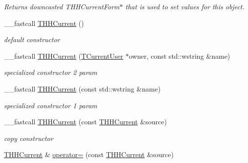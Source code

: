 \begin{DoxyCompactItemize}
\begin{DoxyCompactList}\small\item\em Returns downcasted T\+H\+H\+Current\+Form$\ast$ that is used to set values for this object. \end{DoxyCompactList}\item 
\hypertarget{class_t_h_h_current_a1cd5d04dc2985d3bd776dbb9e8ed2932}{\+\_\+\+\_\+fastcall \hyperlink{class_t_h_h_current_a1cd5d04dc2985d3bd776dbb9e8ed2932}{T\+H\+H\+Current} ()}\label{class_t_h_h_current_a1cd5d04dc2985d3bd776dbb9e8ed2932}

\begin{DoxyCompactList}\small\item\em default constructor \end{DoxyCompactList}\item 
\hypertarget{class_t_h_h_current_ab1a469b9b65c3a216e956e9542316155}{\+\_\+\+\_\+fastcall \hyperlink{class_t_h_h_current_ab1a469b9b65c3a216e956e9542316155}{T\+H\+H\+Current} (\hyperlink{class_t_current_user}{T\+Current\+User} $\ast$owner, const std\+::wstring \&name)}\label{class_t_h_h_current_ab1a469b9b65c3a216e956e9542316155}

\begin{DoxyCompactList}\small\item\em specialized constructor 2 param \end{DoxyCompactList}\item 
\hypertarget{class_t_h_h_current_a4c14313ed75ec844fbe5c698b1a77d80}{\+\_\+\+\_\+fastcall \hyperlink{class_t_h_h_current_a4c14313ed75ec844fbe5c698b1a77d80}{T\+H\+H\+Current} (const std\+::wstring \&name)}\label{class_t_h_h_current_a4c14313ed75ec844fbe5c698b1a77d80}

\begin{DoxyCompactList}\small\item\em specialized constructor 1 param \end{DoxyCompactList}\item 
\hypertarget{class_t_h_h_current_a43226ed1bcb9c446ecdc8f33365d30e3}{\+\_\+\+\_\+fastcall \hyperlink{class_t_h_h_current_a43226ed1bcb9c446ecdc8f33365d30e3}{T\+H\+H\+Current} (const \hyperlink{class_t_h_h_current}{T\+H\+H\+Current} \&source)}\label{class_t_h_h_current_a43226ed1bcb9c446ecdc8f33365d30e3}

\begin{DoxyCompactList}\small\item\em copy constructor \end{DoxyCompactList}\item 
\hypertarget{class_t_h_h_current_a3b0d3078cf8fddc9b4454eeb8a501a68}{\hyperlink{class_t_h_h_current}{T\+H\+H\+Current} \& \hyperlink{class_t_h_h_current_a3b0d3078cf8fddc9b4454eeb8a501a68}{operator=} (const \hyperlink{class_t_h_h_current}{T\+H\+H\+Current} \&source)}\label{class_t_h_h_current_a3b0d3078cf8fddc9b4454eeb8a501a68}


\end{DoxyCompactItemize}
